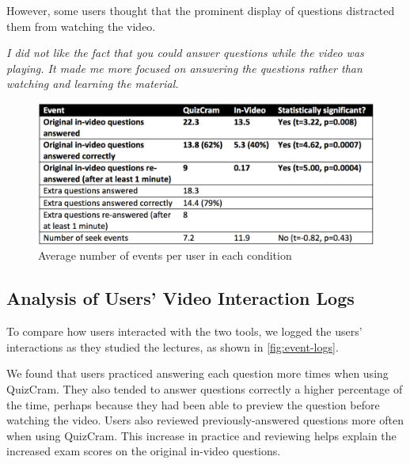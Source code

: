 \documentclass{sigchi}
\begin{document}
However, some users thought that the prominent display of questions distracted them from watching the video.

\textit{I did not like the fact that you could answer questions while the video was playing. It made me more focused on answering the questions rather than watching and learning the material.}

\begin{figure}
\centering
\includegraphics[width=1.0\columnwidth]{event-logs}
\caption{Average number of events per user in each condition}
\label{fig:event-logs}
\end{figure}

\subsection{Analysis of Users' Video Interaction Logs}


To compare how users interacted with the two tools, we logged the users' interactions as they studied the lectures, as shown in \autoref{fig:event-logs}.

We found that users practiced answering each question more times when using QuizCram. They also tended to answer questions correctly a higher percentage of the time, perhaps because they had been able to preview the question before watching the video. Users also reviewed previously-answered questions more often when using QuizCram. This increase in practice and reviewing helps explain the increased exam scores on the original in-video questions. %
\end{document}
